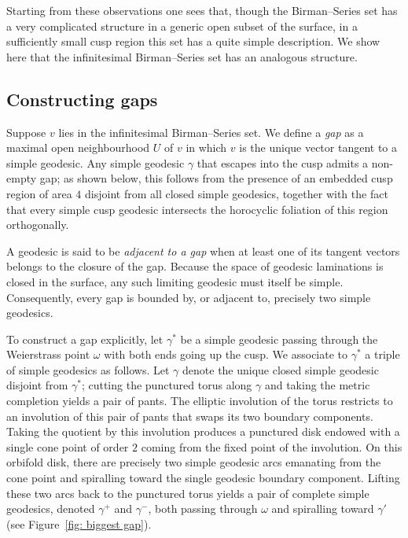 \documentclass[14pt,a4paper]{amsart}
\begin{document}
Starting from these observations one sees that, though the Birman--Series set has a very complicated structure in a generic open subset of the surface, in a sufficiently small cusp region this set has a quite simple description. We show here that the infinitesimal Birman--Series set has an analogous structure. 


\subsection{Constructing gaps}

Suppose $v$ lies in the infinitesimal Birman--Series set. We define a \emph{gap} as a maximal open neighbourhood $U$ of $v$ in which $v$ is the unique vector tangent to a simple geodesic. Any simple geodesic $\gamma$ that escapes into the cusp admits a non-empty gap; as shown below, this follows from the presence of an embedded cusp region of area $4$ disjoint from all closed simple geodesics, together with the fact that every simple cusp geodesic intersects the horocyclic foliation of this region orthogonally.

A geodesic is said to be \emph{adjacent to a gap} when at least one of its tangent vectors belongs to the closure of the gap. Because the space of geodesic laminations is closed in the surface, any such limiting geodesic must itself be simple. Consequently, every gap is bounded by, or adjacent to, precisely two simple geodesics.

To construct a gap explicitly, let $\gamma^*$ be a simple geodesic
passing through the Weierstrass point $\omega$ with both ends going
up the cusp. We associate to $\gamma^*$ a triple of simple geodesics
as follows. Let $\gamma$ denote the unique closed simple geodesic
disjoint from $\gamma^*$; cutting the punctured torus along $\gamma$
and taking the metric completion yields a pair of pants. The
elliptic involution of the torus restricts to an involution of this
pair of pants that swaps its two boundary components. Taking the
quotient by this involution produces a punctured disk endowed with a
single cone point of order $2$ coming from the fixed point of the
involution. On this orbifold disk, there are precisely two simple
geodesic arcs emanating from the cone point and spiralling toward
the single geodesic boundary component. Lifting these two arcs back
to the punctured torus yields a pair of complete simple geodesics,
denoted $\gamma^+$ and $\gamma^-$, both passing through $\omega$ and
spiralling toward $\gamma'$ (see Figure~\ref{fig: biggest gap}).
\end{document}
